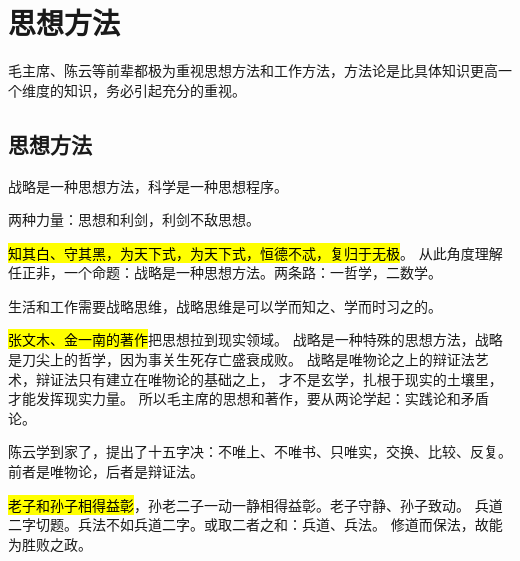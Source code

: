 \chapter{思想方法}

毛主席、陈云等前辈都极为重视思想方法和工作方法，方法论是比具体知识更高一个维度的知识，务必引起充分的重视。

\section{思想方法}

战略是一种思想方法，科学是一种思想程序。

两种力量：思想和利剑，利剑不敌思想。

\hl{知其白、守其黑，为天下式，为天下式，恒德不忒，复归于无极}。
从此角度理解任正非，一个命题：战略是一种思想方法。两条路：一哲学，二数学。

生活和工作需要战略思维，战略思维是可以学而知之、学而时习之的。

\hl{张文木、金一南的著作}把思想拉到现实领域。
战略是一种特殊的思想方法，战略是刀尖上的哲学，因为事关生死存亡盛衰成败。
战略是唯物论之上的辩证法艺术，辩证法只有建立在唯物论的基础之上，
才不是玄学，扎根于现实的土壤里，才能发挥现实力量。
所以毛主席的思想和著作，要从两论学起：实践论和矛盾论。

陈云学到家了，提出了十五字决：不唯上、不唯书、只唯实，交换、比较、反复。
前者是唯物论，后者是辩证法。

\hl{老子和孙子相得益彰}，孙老二子一动一静相得益彰。老子守静、孙子致动。
兵道二字切题。兵法不如兵道二字。或取二者之和：兵道、兵法。
修道而保法，故能为胜败之政。
